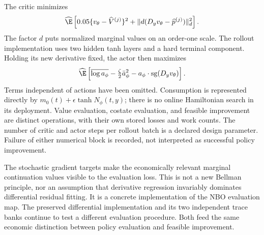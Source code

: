 The critic minimizes
\begin{equation}\label{eq:r11critic}
 \widehat{\E}\left[
  0.05\{v_\theta-\widehat V^{(j)}\}^2+
  \|d(D_yv_\theta-\widehat p^{(j)})\|_d^2\right].
\end{equation}
The factor $d$ puts normalized marginal values on an order-one scale. The rollout implementation uses two hidden tanh layers and a hard terminal component. Holding its new derivative fixed, the actor then maximizes
\begin{equation}\label{eq:r11actor}
 \widehat{\E}\left[
 \overline{\log a_\phi}-\tfrac\zeta2\bar a_\phi^2
                          -a_\phi\mathbin{\cdot}\operatorname{sg}(D_yv_\theta)\right].
\end{equation}
Terms independent of actions have been omitted. Consumption is represented directly by $m_0(t)+\epsilon\tanh N_\phi(t,y)$; there is no online Hamiltonian search in its deployment. Value evaluation, costate evaluation, and feasible improvement are distinct operations, with their own stored losses and work counts. The number of critic and actor steps per rollout batch is a declared design parameter. Failure of either numerical block is recorded, not interpreted as successful policy improvement.

The stochastic gradient targets make the economically relevant marginal continuation values visible to the evaluation loss. This is not a new Bellman principle, nor an assumption that derivative regression invariably dominates differential residual fitting. It is a concrete implementation of the NBO evaluation map. The preserved differential implementation and its two independent trace banks continue to test a different evaluation procedure. Both feed the same economic distinction between policy evaluation and feasible improvement.

